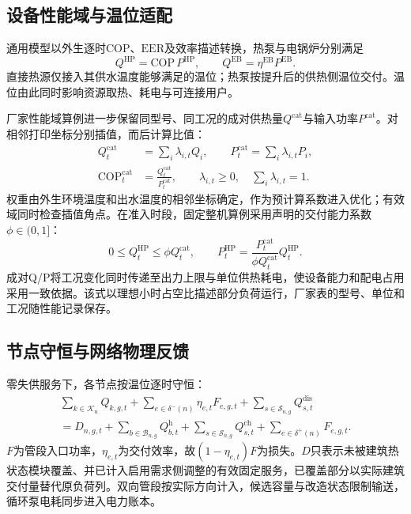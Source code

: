 \subsection{设备性能域与温位适配}

通用模型以外生逐时$\mathrm{COP}$、$\mathrm{EER}$及效率描述转换，热泵与电锅炉分别满足
\begin{equation}
Q^{\mathrm{HP}}=\mathrm{COP}\,P^{\mathrm{HP}},\qquad
Q^{\mathrm{EB}}=\eta^{\mathrm{EB}}P^{\mathrm{EB}} .
\label{eq:scoring-conversion}
\end{equation}
直接热源仅接入其供水温度能够满足的温位；热泵按提升后的供热侧温位交付。温位由此同时影响资源取热、耗电与可连接用户。

厂家性能域算例进一步保留同型号、同工况的成对供热量$Q^{\mathrm{cat}}$与输入功率$P^{\mathrm{cat}}$。对相邻打印坐标分别插值，而后计算比值：
\begin{equation}
\begin{aligned}
Q_t^{\mathrm{cat}}&=\sum_i\lambda_{i,t}Q_i,\qquad
P_t^{\mathrm{cat}}=\sum_i\lambda_{i,t}P_i,\\
\mathrm{COP}_t^{\mathrm{cat}}&=\frac{Q_t^{\mathrm{cat}}}{P_t^{\mathrm{cat}}},\qquad
\lambda_{i,t}\geq0,\quad \sum_i\lambda_{i,t}=1 .
\end{aligned}
\label{eq:scoring-performance}
\end{equation}
权重由外生环境温度和出水温度的相邻坐标确定，作为预计算系数进入优化；有效域同时检查插值角点。在准入时段，固定整机算例采用声明的交付能力系数$\phi\in(0,1]$：
\begin{equation}
0\leq Q_t^{\mathrm{HP}}\leq\phi Q_t^{\mathrm{cat}},\qquad
P_t^{\mathrm{HP}}=
\frac{P_t^{\mathrm{cat}}}{\phi Q_t^{\mathrm{cat}}}Q_t^{\mathrm{HP}} .
\label{eq:scoring-duty}
\end{equation}
成对Q/P将工况变化同时传递至出力上限与单位供热耗电，使设备能力和配电占用采用一致依据。该式以理想小时占空比描述部分负荷运行，厂家表的型号、单位和工况随性能记录保存。

\subsection{节点守恒与网络物理反馈}

零失供服务下，各节点按温位逐时守恒：
\begin{multline}
\sum_{k\in\mathcal K_n}Q_{k,g,t}
+\sum_{e\in\delta^-(n)}\eta_{e,t}F_{e,g,t}
+\sum_{s\in\mathcal S_{n,g}}Q_{s,t}^{\mathrm{dis}}\\
=D_{n,g,t}+\sum_{b\in\mathcal B_{n,g}}Q_{b,t}^{\mathrm h}
+\sum_{s\in\mathcal S_{n,g}}Q_{s,t}^{\mathrm{ch}}
+\sum_{e\in\delta^+(n)}F_{e,g,t}.
\label{eq:scoring-node}
\end{multline}
$F$为管段入口功率，$\eta_{e,t}$为交付效率，故$(1-\eta_{e,t})F$为损失。$D$只表示未被建筑热状态模块覆盖、并已计入启用需求侧调整的有效固定服务，已覆盖部分以实际建筑交付量替代原负荷列。双向管段按实际方向计入，候选容量与改造状态限制输送，循环泵电耗同步进入电力账本。

